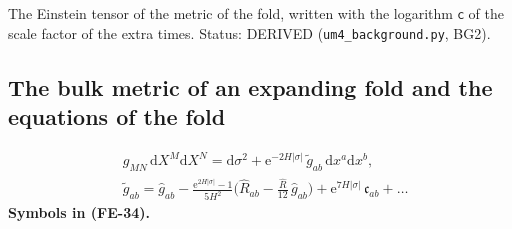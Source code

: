 \documentclass[
  10pt,
]{article}
\begin{document}
The Einstein tensor of the metric of the fold, written with the
logarithm \(\mathsf{c}\) of the scale factor of the extra times. Status:
DERIVED (\texttt{um4\_background.py}, BG2).

\hypertarget{the-bulk-metric-of-an-expanding-fold-and-the-equations-of-the-fold}{%
\subsection{The bulk metric of an expanding fold and the equations of
the
fold}\label{the-bulk-metric-of-an-expanding-fold-and-the-equations-of-the-fold}}

\[
\begin{aligned}
&g_{MN}\,\mathrm{d}X^M\mathrm{d}X^N = \mathrm{d}\sigma^2 + \mathrm{e}^{-2H\lvert\sigma\rvert}\,\tilde g_{ab}\,\mathrm{d}x^a\mathrm{d}x^b,\\
&\tilde g_{ab} = \hat g_{ab} - \frac{\mathrm{e}^{2H\lvert\sigma\rvert} - 1}{5H^2}\Big(\hat R_{ab} - \frac{\hat R}{12}\,\hat g_{ab}\Big)
 + \mathrm{e}^{7H\lvert\sigma\rvert}\,\mathfrak{c}_{ab} + \dots
\end{aligned} \tag{FE-34}
\] \textbf{Symbols in (FE-34).}
\end{document}
